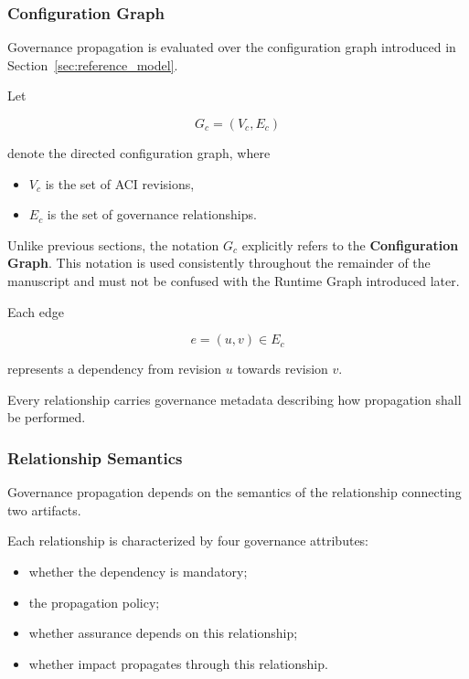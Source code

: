 \documentclass[10pt]{article}
\begin{document}
\subsubsection{Configuration Graph}

Governance propagation is evaluated over the configuration graph introduced in
Section~\ref{sec:reference_model}.

Let

\begin{equation}
G_c=(V_c,E_c)
\label{eq:configuration_graph}
\end{equation}

denote the directed configuration graph, where

\begin{itemize}
    \item $V_c$ is the set of ACI revisions,
    \item $E_c$ is the set of governance relationships.
\end{itemize}

Unlike previous sections, the notation $G_c$ explicitly refers to the
\textbf{Configuration Graph}. This notation is used consistently throughout the
remainder of the manuscript and must not be confused with the Runtime Graph
introduced later.

Each edge

\[
e=(u,v)\in E_c
\]

represents a dependency from revision $u$ towards revision $v$.

Every relationship carries governance metadata describing how propagation shall
be performed.

\subsubsection{Relationship Semantics}

Governance propagation depends on the semantics of the relationship connecting
two artifacts.

Each relationship is characterized by four governance attributes:

\begin{itemize}
    \item whether the dependency is mandatory;
    \item the propagation policy;
    \item whether assurance depends on this relationship;
    \item whether impact propagates through this relationship.
\end{itemize}
\end{document}
